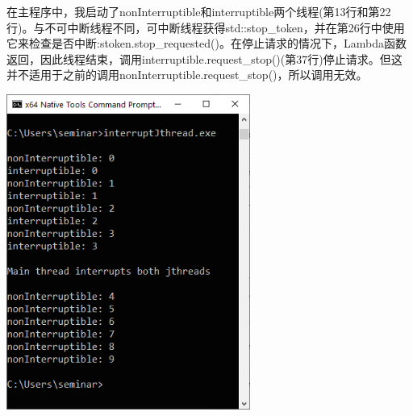 在主程序中，我启动了nonInterruptible和interruptible两个线程(第13行和第22行)。与不可中断线程不同，可中断线程获得std::stop\_token，并在第26行中使用它来检查是否中断:stoken.stop\_requested()。在停止请求的情况下，Lambda函数返回，因此线程结束，调用interruptible.request\_stop()(第37行)停止请求。但这并不适用于之前的调用nonInterruptible.request\_stop()，所以调用无效。

\begin{center}
\includegraphics[width=0.6\textwidth]{content/3/chapter6/images/27.png}\\
\end{center}

\newpage

























